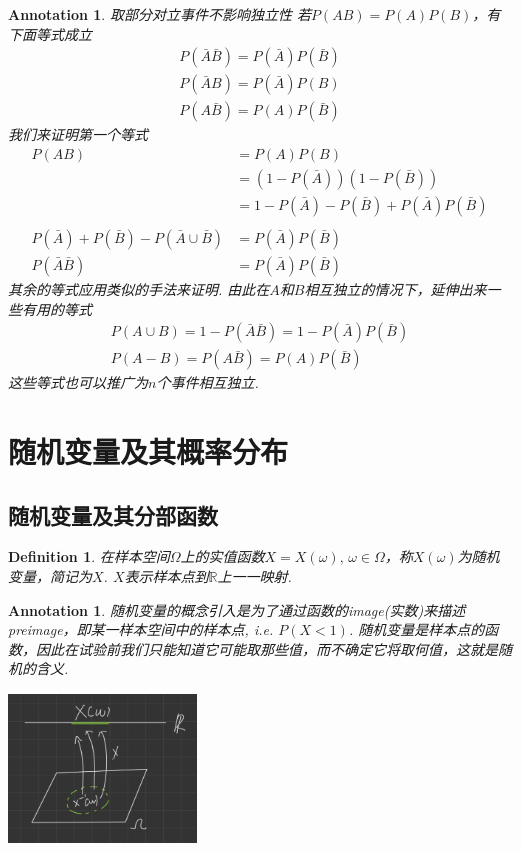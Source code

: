 \documentclass{article}
\newtheorem{definition}[theorem]{Definition}
\newtheorem{annotation}[theorem]{Annotation}
\begin{document}
\begin{annotation}
\rm {\color{red} 取部分对立事件不影响独立性} 若$P(AB) = P(A)P(B)$，有下面等式成立
$$
\begin{array}{l}
P(\bar{A}\bar{B}) = P(\bar{A})P(\bar{B})\\
P(\bar{A}B) = P(\bar{A})P(B)\\
P(A\bar{B}) = P(A)P(\bar{B})
\end{array}
$$
我们来证明第一个等式
$$
\begin{array}{rl}
P(AB) &= P(A)P(B) \\
	  &= (1-P(\bar{A}))(1-P(\bar{B}))\\
	  &= 1-P(\bar{A})-P(\bar{B}) + P(\bar{A})P(\bar{B})\\
	  \\
P(\bar{A}) + P(\bar{B}) - P(\bar{A} \cup \bar{B}) &= P(\bar{A})P(\bar{B}) \\
P(\bar{A}\bar{B}) &= P(\bar{A})P(\bar{B})
\end{array}
$$
其余的等式应用类似的手法来证明. 由此在$A$和$B$相互独立的情况下，延伸出来一些有用的等式
$$
\begin{array}{l}
P(A \cup B) = 1 - P(\bar{A}\bar{B}) = 1-P(\bar{A})P(\bar{B})\\
P(A-B) = P(A\bar{B}) = P(A)P(\bar{B}) 
\end{array}
$$
这些等式也可以推广为$n$个事件相互独立.
\end{annotation}


\section{随机变量及其概率分布}

\subsection{随机变量及其分部函数}

\begin{definition}
\rm 在样本空间$\Omega$上的实值函数$X=X(\omega),\, \omega \in \Omega$，称$X(\omega)$为{\color{red}随机变量}，简记为$X$. $X$表示样本点到$\mathbb{R}$上一一映射.  
\end{definition}

\begin{annotation}
\rm 随机变量的概念引入是为了通过函数的image(实数)来描述preimage，即某一样本空间中的样本点, i.e. $P(X < 1)$. 随机变量是样本点的函数，因此在试验前我们只能知道它可能取那些值，而不确定它将取何值，这就是随机的含义. 
\begin{center}
\includegraphics[width=5cm, height=4cm]{images/random_variable.jpg}
\end{center}
\end{annotation}
\end{document}
